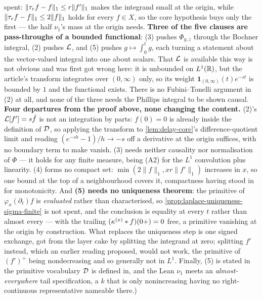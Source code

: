 \begin{lemma}
{spent: $\|\tau_rf-f\|_1 \le r\|f'\|_1$ makes the integrand small at the origin, while
$\|\tau_rf-f\|_1 \le 2\|f\|_1$ holds for every $f \in X$, so the core hypothesis buys only the first
--- the half $\nu_1$'s mass at the origin needs.
\textbf{Three of the five clauses are pass-throughs of a bounded functional}: (3) pushes
$\Phi_{y,z}$ through the Bochner integral, (2) pushes $\mathcal{L}$, and (5) pushes
$g \mapsto \int_0^t g$, each turning a statement about the vector-valued integral into one about
scalars. That $\mathcal{L}$ is available this way is not obvious and was first got wrong here: it is
unbounded on $L^1(\mathbb{R})$, but the article's transform integrates over $(0,\infty)$ only, so its
weight $\mathbf{1}_{(0,\infty)}(t)e^{-st}$ is bounded by $1$ and the functional exists. There is
no Fubini--Tonelli argument in (2) at all, and none of the three needs the Phillips integral to be
shown causal.
\textbf{Four departures from the proof above, none changing the content.} (2)'s
$\mathcal{L}[f'] = s\hat f$ is not an integration by parts: $f(0)=0$ is already inside the definition of
$\mathcal{D}$, so applying the transform to \ref{lem:delay-core}'s difference-quotient limit and reading
$(e^{-sh}-1)/h \to -s$ off a derivative at the origin suffices, with no boundary term to make
vanish. (3) needs neither causality nor normalisation of $\Phi$ --- it holds for any finite
measure, being (A2) for the $L^1$ convolution plus linearity. (4) forms no compact set:
$\min(2\|f\|_1, xr\|f'\|_1)$ increases in $x$, so one bound at the top of a neighbourhood covers
it, compactness having stood in for monotonicity. And \textbf{(5) needs no uniqueness theorem}:
the primitive of $\varphi_x(\partial_t)f$ is \emph{evaluated} rather than characterised, so
\ref{prop:laplace-uniqueness-sigma-finite} is not spent, and the conclusion is equality at every $t$ rather
than almost every --- with the trailing $(\kappa^{(x)}*f)(0{+})=0$ free, a primitive vanishing at
the origin by construction. What replaces the uniqueness step is one signed exchange, got from the
layer cake by splitting the integrand at zero; splitting $f'$ instead, which an earlier reading
proposed, would not work, the primitive of $(f')^+$ being nondecreasing and so generally not in
$L^1$.
Finally, (5) is stated in the primitive vocabulary $\mathcal{D}$ is defined in, and the Lean $\nu_1$
meets an \emph{almost-everywhere} tail specification, a $k$ that is only nonincreasing having no
right-continuous representative nameable there.)}
\end{lemma}


